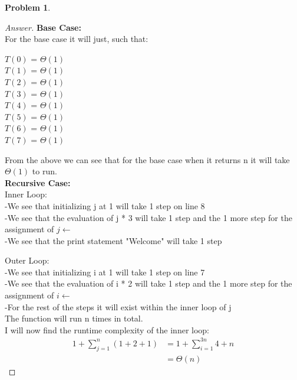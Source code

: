 \documentclass[11pt]{article}
\theoremstyle{definition}
\theoremstyle{definition}
\newtheorem{required}{Problem}
\theoremstyle{definition}
\begin{document}
\begin{required}
\begin{enumerate}[label=(\alph*)]
\begin{proof}[Answer]
\textbf{Base Case:} \\
For the base case it will just, such that: \\
\begin{center}
$T(0)$ = $\Theta(1)$ \\
$T(1)$ = $\Theta(1)$ \\ 
$T(2)$ = $\Theta(1)$ \\
$T(3)$ = $\Theta(1)$ \\
$T(4)$ = $\Theta(1)$ \\ 
$T(5)$ = $\Theta(1)$ \\
$T(6)$ = $\Theta(1)$ \\
$T(7)$ = $\Theta(1)$ \\
\end{center}
From the above we can see that for the base case when it returns n it will take $\Theta(1)$ to run. \\

\textbf{Recursive Case:} \\
Inner Loop: \\
\indent -We see that initializing j at 1 will take 1 step on line 8\\
\indent -We see that the evaluation of j * 3 will take 1 step and the 1 more step for the assignment of $j \gets$ \\
\indent -We see that the print statement "Welcome" will take 1 step 

Outer Loop: \\
\indent -We see that initializing i at 1 will take 1 step on line 7\\
\indent -We see that the evaluation of i * 2 will take 1 step and the 1 more step for the assignment of $i \gets$ \\
\indent -For the rest of the steps it will exist within the inner loop of j \\

The function will run n times in total. \\

I will now find the runtime complexity of the inner loop: \\
\begin{align*}
1 + \sum_{j=1}^{n} (1 + 2 + 1) &= 1 + \sum_{i=1}^{3n}  4 + n \\
&= \Theta(n)
\end{align*}




\end{proof}

\end{enumerate}

\end{required}
\end{document}
